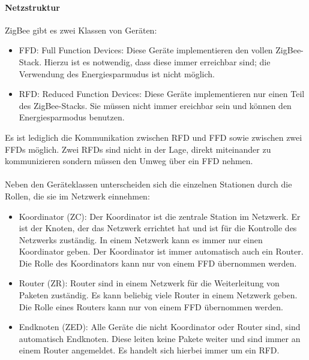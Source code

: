             \paragraph{Netzstruktur}
                ZigBee gibt es zwei Klassen von Geräten:

                \begin{itemize}
                    \item{FFD:} Full Function Devices: Diese Geräte implementieren
                                den vollen ZigBee-Stack. Hierzu ist es notwendig,
                                dass diese immer erreichbar sind; die Verwendung
                                des Energiesparmudus ist nicht möglich.
                    \item{RFD:} Reduced Function Devices: Diese Geräte implementieren
                                nur einen Teil des ZigBee-Stacks. Sie müssen nicht
                                immer ereichbar sein und können den Energiesparmodus
                                benutzen. 
                \end{itemize}

                Es ist lediglich die Kommunikation zwischen RFD und FFD sowie zwischen
                zwei FFDs möglich. Zwei RFDs sind nicht in der Lage, direkt miteinander
                zu kommunizieren sondern müssen den Umweg über ein FFD nehmen.\\
                \\
                Neben den Geräteklassen unterscheiden sich die einzelnen Stationen durch
                die Rollen, die sie im Netzwerk einnehmen:

                \begin{itemize}
                    \item{Koordinator (ZC):} Der Koordinator ist die zentrale Station im Netzwerk.
                                        Er ist der Knoten, der das Netzwerk errichtet hat
                                        und ist für die Kontrolle des Netzwerks zuständig.
                                        In einem Netzwerk kann es immer nur einen Koordinator
                                        geben. Der Koordinator ist immer automatisch auch
                                        ein Router. Die Rolle des Koordinators kann nur von einem
                                        FFD übernommen werden.
                    \item{Router (ZR):} Router sind in einem Netzwerk für die Weiterleitung von
                                   Paketen zuständig. Es kann beliebig viele Router in einem
                                   Netzwerk geben. Die Rolle eines Routers kann nur von einem
                                   FFD übernommen werden.
                    \item{Endknoten (ZED):} Alle Geräte die nicht Koordinator oder Router sind,
                                            sind automatisch Endknoten. Diese leiten keine Pakete
                                            weiter und sind immer an einem Router angemeldet.
                                            Es handelt sich hierbei immer um ein RFD.
                \end{itemize}

